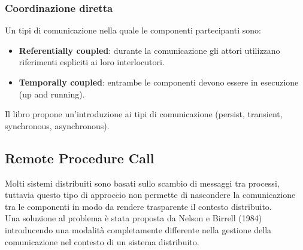 \documentclass[12pt]{article}
\begin{document}
		\subsubsection{Coordinazione diretta}
				
			Un tipi di comunicazione nella quale le componenti partecipanti sono:
			\begin{itemize}
				\item \textbf{Referentially coupled}: durante la comunicazione gli attori utilizzano riferimenti espliciti ai loro interlocutori.
				\item \textbf{Temporally coupled}: entrambe le componenti devono essere in esecuzione (up and running).	
			\end{itemize}
			Il libro propone un'introduzione ai tipi di comunicazione (persist, transient, synchronous, asynchronous).
			
	\subsection{Remote Procedure Call}
		Molti sistemi distribuiti sono basati sullo scambio di messaggi tra processi, tuttavia questo tipo di approccio non permette di nascondere la comunicazione tra le componenti in modo da rendere trasparente il contesto distribuito. \\
		Una soluzione al problema è stata proposta da Nelson e Birrell (1984) introducendo una modalità completamente differente nella gestione della comunicazione nel contesto di un sistema distribuito.
		
		
		
		
				
			
				
				
			
		
		
		
		
		
		
		
		
		
		
		
		
		
		
		
		
		
		
		
		
		
		
		
		
		
		
		
		
\end{document}
